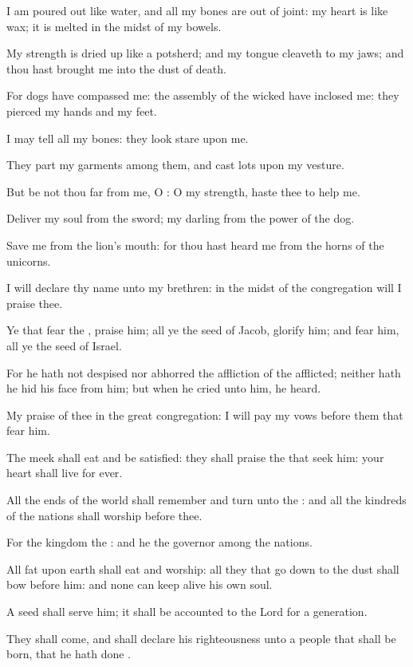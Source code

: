 {\par }{\Q {}I am poured
out like
water, and all my
bones are out of
joint: my
heart is like
wax; it is
melted in the
midst of my
bowels.
\par }{\Q {}My
strength is dried
up like a
potsherd; and my
tongue
cleaveth to my
jaws; and thou hast
brought me into the
dust of
death.
\par }{\Q {}For
dogs have
compassed me: the
assembly of the
wicked have
inclosed me: they
pierced my
hands and my
feet.
\par }{\Q {}I may
tell all my
bones: they
look
{}
stare upon me.
\par }{\Q {}They
part my
garments among them, and
cast
lots upon my
vesture.
\par }{\Q {}But be not thou
far from me, O
{}: O my
strength,
haste thee to
help me.
\par }{\Q {}Deliver my
soul from the
sword; my
darling from the
power of the
dog.
\par }{\Q {}Save me from the
lion’s
mouth: for thou hast
heard me from the
horns of the
unicorns.
\par }{\BB \par }{\Q {}I will
declare thy
name unto my
brethren: in the
midst of the
congregation will I
praise thee.
\par }{\Q {}Ye that
fear the
{},
praise him; all ye the
seed of
Jacob,
glorify him; and
fear him, all ye the
seed of
Israel.
\par }{\Q {}For he hath not
despised nor
abhorred the
affliction of the
afflicted; neither hath he
hid his
face from him; but when he
cried unto him, he
heard.
\par }{\Q {}My
praise
{} of thee in the
great
congregation: I will
pay my
vows before them that
fear him.
\par }{\Q {}The
meek shall
eat and be
satisfied: they shall
praise the
{} that
seek him: your
heart shall
live for
ever.
\par }{\Q {}All the
ends of the
world shall
remember and
turn unto the
{}: and all the
kindreds of the
nations shall
worship
before thee.
\par }{\Q {}For the
kingdom
{} the
{}: and he
{} the
governor among the
nations.
\par }{\Q {}All
{}
fat upon
earth shall
eat and
worship: all they that go
down to the
dust shall
bow
before him: and none can keep
alive his own
soul.
\par }{\Q {}A
seed shall
serve him; it shall be
accounted to the
Lord for a
generation.
\par }{\Q {}They shall
come, and shall
declare his
righteousness unto a
people that shall be
born, that he hath
done
{}.

}
